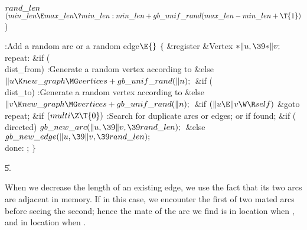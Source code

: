 \B\D$\\{rand\_len}$ \5
$(\\{min\_len}\E\\{max\_len}\?\\{min\_len}:\\{min\_len}+\\{gb\_unif\_rand}(%
\\{max\_len}-\\{min\_len}+\T{1}){}$)\par
\Y\B\4:Add a random arc or a random edge\X${}\E{}$\6
${}\{{}$\5
\1\&{register} \&{Vertex} ${}{*}\|u,\39{*}\|v;{}$\7
\4\\{repeat}:\6
\&{if} (\\{dist\_from})\1\5
:Generate a random vertex  according to \X\2\6
\&{else}\1\5
${}\|u\K\\{new\_graph}\MG\\{vertices}+\\{gb\_unif\_rand}(\|n);{}$\2\6
\&{if} (\\{dist\_to})\1\5
:Generate a random vertex  according to \X\2\6
\&{else}\1\5
${}\|v\K\\{new\_graph}\MG\\{vertices}+\\{gb\_unif\_rand}(\|n);{}$\2\6
\&{if} ${}(\|u\E\|v\W\R\\{self}){}$\1\5
\&{goto} \\{repeat};\2\6
\&{if} ${}(\\{multi}\Z\T{0}){}$\1\5
:Search for duplicate arcs or edges;  or  if found\X;\2\6
\&{if} (\\{directed})\1\5
${}\\{gb\_new\_arc}(\|u,\39\|v,\39\\{rand\_len});{}$\2\6
\&{else}\1\5
${}\\{gb\_new\_edge}(\|u,\39\|v,\39\\{rand\_len});{}$\2\6
\4\\{done}:\5
;\6
\4${}\}{}$\2\par
\U5.\fi

When we decrease the length of an existing edge, we use the fact that
its two arcs are adjacent in memory. If  in this case, we
encounter
the first of two mated arcs before seeing the second; hence the mate of
the arc we find is in location  when , and in
location
 when .

